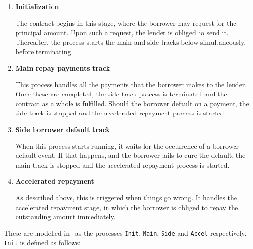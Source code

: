 \documentclass{article}
\begin{document}
\begin{enumerate}
  \item \textbf{Initialization}
  
  The contract begins in this stage, where the borrower may
  request for the principal amount.
  Upon such a request, the lender is obliged to send it.
  Thereafter, the process starts the main and side tracks below simultaneously,
  before terminating.

  \item \textbf{Main repay payments track}

  This process handles all the payments that the borrower makes to the lender.
  Once these are completed, the side track process is
  terminated and the contract as a whole is fulfilled.
  Should the borrower default on a payment, the side track is stopped and
  the accelerated repayment process is started.

  \item \textbf{Side borrower default track}

  When this process starts running, it waits for the occurrence of a borrower
  default event.
  If that happens, and the borrower fails to cure the default,
  the main track is stopped and the accelerated repayment process is started.

  \item \textbf{Accelerated repayment}

  As described above, this is triggered when things go wrong.
  It handles the accelerated repayment stage, in which the borrower is obliged
  to repay the outstanding amount immediately.
\end{enumerate}


These are modelled in \mcrl \, as the processes
\texttt{Init}, \texttt{Main}, \texttt{Side} and \texttt{Accel} respectively.
\texttt{Init} is defined as follows:


\end{document}
